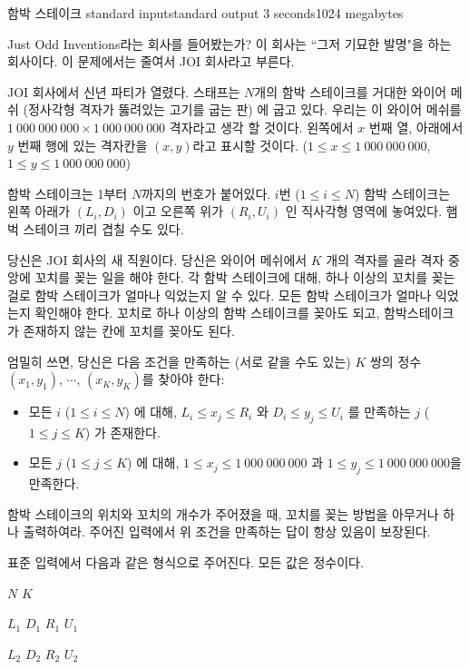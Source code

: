 \begin{problem}{함박 스테이크}
	{standard input}{standard output}
	{3 seconds}{1024 megabytes}{}
	
	Just Odd Inventions라는 회사를 들어봤는가? 이 회사는 ``그저 기묘한 발명"을 하는 회사이다. 이 문제에서는 줄여서 JOI 회사라고 부른다.
	
	JOI 회사에서 신년 파티가 열렸다. 스태프는 $N$개의 함박 스테이크를 거대한 와이어 메쉬 (정사각형 격자가 뚫려있는 고기를 굽는 판) 에 굽고 있다. 우리는 이 와이어 메쉬를 $1\ 000\ 000\ 000 \times 1\ 000\ 000\ 000$ 격자라고 생각 할 것이다. 왼쪽에서 $x$ 번째 열, 아래에서 $y$ 번째 행에 있는 격자칸을 $(x, y)$라고 표시할 것이다. ($1 \le x \le 1\ 000\ 000\ 000$, $1 \le y \le 1\ 000\ 000\ 000$)
	
	함박 스테이크는 1부터 $N$까지의 번호가 붙어있다. $i$번 ($1 \le i \le N$) 함박 스테이크는 왼쪽 아래가 $(L_i, D_i)$ 이고 오른쪽 위가 $(R_i, U_i)$ 인 직사각형 영역에 놓여있다. 햄벅 스테이크 끼리 겹칠 수도 있다.
	
	당신은 JOI 회사의 새 직원이다. 당신은 와이어 메쉬에서 $K$ 개의 격자를 골라 격자 중앙에 꼬치를 꽂는 일을 해야 한다. 각 함박 스테이크에 대해, 하나 이상의 꼬치를 꽂는 걸로 함박 스테이크가 얼마나 익었는지 알 수 있다. 모든 함박 스테이크가 얼마나 익었는지 확인해야 한다. 꼬치로 하나 이상의 함박 스테이크를 꽂아도 되고, 함박스테이크가 존재하지 않는 칸에 꼬치를 꽂아도 된다.
	
	엄밀히 쓰면, 당신은 다음 조건을 만족하는 (서로 같을 수도 있는) $K$ 쌍의 정수 $(x_1, y_1)$, $\cdots$, $(x_K, y_K)$를 찾아야 한다:
	
	\begin{itemize}
		\item 모든 $i$ ($1 \le i \le N$) 에 대해, $L_i \le x_j \le R_i$ 와 $D_i \le y_j \le U_i$ 를 만족하는 $j$ ($1 \le j \le K$) 가 존재한다.
		\item 모든 $j$ ($1 \le j \le K$) 에 대해, $1 \le x_j \le 1\ 000\ 000\ 000$ 과 $1 \le y_j \le 1\ 000\ 000\ 000$을 만족한다.
	\end{itemize}

	함박 스테이크의 위치와 꼬치의 개수가 주어졌을 때, 꼬치를 꽂는 방법을 아무거나 하나 출력하여라. 주어진 입력에서 위 조건을 만족하는 답이 항상 있음이 보장된다.

	
\InputFile

표준 입력에서 다음과 같은 형식으로 주어진다. 모든 값은 정수이다.

$N$ $K$

$L_1$ $D_1$ $R_1$ $U_1$

$L_2$ $D_2$ $R_2$ $U_2$


\end{problem}
